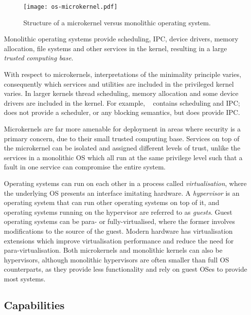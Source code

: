 \begin{figure}
	\begin{center}
		\leavevmode
        \texttt{[image: os-microkernel.pdf]}
		\caption{Structure of a microkernel versus monolithic operating system.}
		\label{fig:os-microkernel}
	\end{center}
\end{figure}

Monolithic operating systems provide scheduling, \gls{IPC}, device drivers, memory allocation, file
systems and other services in the kernel, resulting in a large \emph{trusted computing base}.

With respect to microkernels, interpretations of the minimality principle varies, 
consequently which services and utilities are included in the privileged kernel varies. In
larger kernels thread scheduling, memory allocation and some device drivers are included in the kernel.
For example, \selfour~\citep{Klein_EHACDEEKNSTW_09} contains scheduling and \gls{IPC}; 
\composite~\citep{Parmer:phd} does not provide a scheduler, or any blocking semantics, but does
provide \gls{IPC}. 

Microkernels are far more amenable for deployment in areas where security is a primary concern,
due to their small trusted computing base.
Services on top of the microkernel can be isolated and assigned different levels of trust, unlike
the services in a monolithic \gls{OS} which all run at the same privilege level such that a fault in
one service can compromise the entire system. 

Operating systems can run on each other in a process called \emph{virtualisation}, where the
underlying OS presents an interface imitating hardware. A \emph{hypervisor} is an operating system that can
run other operating systems on top of it, and operating systems running on the hypervisor are
referred to as \emph{guests}. Guest operating systems can be para- or fully-virtualised, where the
former involves modifications to the source of the guest. Modern hardware has virtualisation
extensions which improve virtualisation performance and reduce the need for para-virtualisation.
Both microkernels and monolithic kernels can also be hypervisors, although monolithic hypervisors
are often smaller than full OS counterparts, as they provide less functionality and rely on guest
OSes to provide most systems. 

\subsection{Capabilities}
\label{s:b-capabilities}

